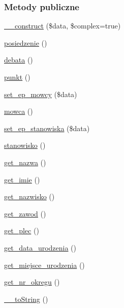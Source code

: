 \subsubsection*{Metody publiczne}
\begin{DoxyCompactItemize}
\item 
\hyperlink{classep___sejm___wystapienie_a8c384d5e0f13f64cbf8c51096faa7738}{\-\_\-\-\_\-construct} (\$data, \$complex=true)
\item 
\hyperlink{classep___sejm___wystapienie_abfdc29f0533665ad6c77341c5fa3f7c7}{posiedzenie} ()
\item 
\hyperlink{classep___sejm___wystapienie_a7fe12606c5b0d87a6f1d26d2470a10c2}{debata} ()
\item 
\hyperlink{classep___sejm___wystapienie_a33d6419a012729a56ab84c223a587ee2}{punkt} ()
\item 
\hyperlink{classep___sejm___wystapienie_a394835ac1f34d44b5181f5e2e704deb4}{set\-\_\-ep\-\_\-mowcy} (\$data)
\item 
\hyperlink{classep___sejm___wystapienie_a0a281f2a729be7088e24f59b2a897bb6}{mowca} ()
\item 
\hyperlink{classep___sejm___wystapienie_a57f2e23f1d143edd2d513c213b5a0f52}{set\-\_\-ep\-\_\-stanowiska} (\$data)
\item 
\hyperlink{classep___sejm___wystapienie_a3d84fd752ff96edc69fbe27a52d8d3d7}{stanowisko} ()
\item 
\hyperlink{classep___sejm___wystapienie_ac0818f0049d7b84f08f77128f54cee36}{get\-\_\-nazwa} ()
\item 
\hyperlink{classep___sejm___wystapienie_ac4b0c85dc2a130038f2d118dbd0c3d77}{get\-\_\-imie} ()
\item 
\hyperlink{classep___sejm___wystapienie_abdd1d7ff92508da7f748ba1feec97af0}{get\-\_\-nazwisko} ()
\item 
\hyperlink{classep___sejm___wystapienie_af80ca8310b60004454dd02a387deaa2c}{get\-\_\-zawod} ()
\item 
\hyperlink{classep___sejm___wystapienie_ac7f9af5c3fa024e4c26a7b6bd4ce4bb4}{get\-\_\-plec} ()
\item 
\hyperlink{classep___sejm___wystapienie_a880b240cd2d8c336fd1709bf0cb1ae2c}{get\-\_\-data\-\_\-urodzenia} ()
\item 
\hyperlink{classep___sejm___wystapienie_ac57c08ec5e394a19c5bd9280c8376182}{get\-\_\-miejsce\-\_\-urodzenia} ()
\item 
\hyperlink{classep___sejm___wystapienie_a2645a9f0aa5b0ccc482943348c033d0a}{get\-\_\-nr\-\_\-okregu} ()
\item 
\hyperlink{classep___sejm___wystapienie_a7516ca30af0db3cdbf9a7739b48ce91d}{\-\_\-\-\_\-to\-String} ()
\end{DoxyCompactItemize}

